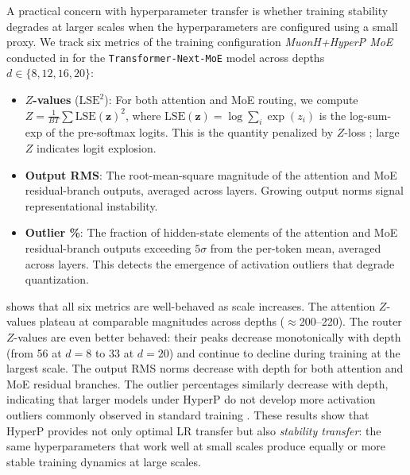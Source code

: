 \documentclass{article}
\begin{document}
A practical concern with hyperparameter transfer is whether training stability degrades at larger scales when the hyperparameters are configured using a small proxy. We track six metrics of the training configuration \emph{MuonH+HyperP MoE} conducted in  for the \texttt{Transformer-Next-MoE} model across depths $d \in \{8, 12, 16, 20\}$:
\begin{itemize}[leftmargin=1.5em,itemsep=2pt]
    \item \textbf{$Z$-values} ($\mathrm{LSE}^2$): For both attention and MoE routing, we compute $Z = \frac{1}{BT}\sum \mathrm{LSE}(\mathbf{z})^2$, where $\mathrm{LSE}(\mathbf{z}) = \log\sum_i \exp(z_i)$ is the log-sum-exp of the pre-softmax logits. This is the quantity penalized by $Z$-loss \cite{zoph2022st0moe0}; large $Z$ indicates logit explosion.
    \item \textbf{Output RMS}: The root-mean-square magnitude of the attention and MoE residual-branch outputs, averaged across layers. Growing output norms signal representational instability.
    \item \textbf{Outlier \%}: The fraction of hidden-state elements of the attention and MoE residual-branch outputs exceeding $5\sigma$ from the per-token mean, averaged across layers.
    This detects the emergence of activation outliers that degrade quantization.
\end{itemize}


 shows that all six metrics are well-behaved as scale increases. The attention $Z$-values plateau at comparable magnitudes across depths ($\approx$200--220). The router $Z$-values are even better behaved: their peaks decrease monotonically with depth (from 56 at $d{=}8$ to 33 at $d{=}20$) and continue to decline during training at the largest scale.
The output RMS norms decrease with depth for both attention and MoE residual branches.
The outlier percentages similarly decrease with depth, indicating that larger models under HyperP do not develop more activation outliers commonly observed in standard training \cite{dettmers2022llm0int8000}. These results show that HyperP provides not only optimal LR transfer but also \emph{stability transfer}: the same hyperparameters that work well at small scales produce equally or more stable training dynamics at large scales.
\end{document}
